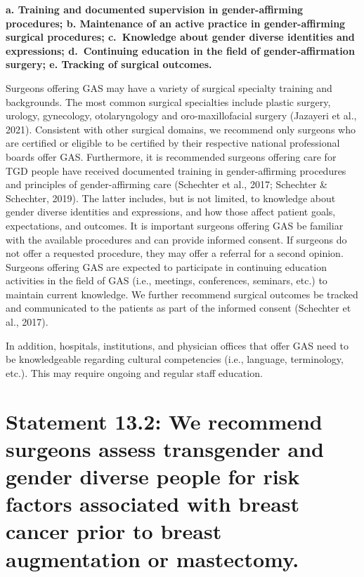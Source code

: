 \documentclass[
]{book}
\begin{document}
\textbf{a. Training and documented supervision in gender-affirming procedures;
b. Maintenance of an active practice in gender-affirming surgical procedures;
c.~Knowledge about gender diverse identities and expressions;
d.~Continuing education in the field of gender-affirmation surgery;
e. Tracking of surgical outcomes.}

Surgeons offering GAS may have a variety of
surgical specialty training and backgrounds. The
most common surgical specialties include plastic
surgery, urology, gynecology, otolaryngology and
oro-maxillofacial surgery (Jazayeri et al., 2021).
Consistent with other surgical domains, we recommend only surgeons who are certified or eligible
to be certified by their respective national professional boards offer GAS. Furthermore, it is recommended surgeons offering care for TGD people
have received documented training in
gender-affirming procedures and principles of
gender-affirming care (Schechter et al., 2017;
Schechter \& Schechter, 2019). The latter includes,
but is not limited, to knowledge about gender
diverse identities and expressions, and how those
affect patient goals, expectations, and outcomes. It
is important surgeons offering GAS be familiar with
the available procedures and can provide informed
consent. If surgeons do not offer a requested procedure, they may offer a referral for a second opinion. Surgeons offering GAS are expected to
participate in continuing education activities in the
field of GAS (i.e., meetings, conferences, seminars,
etc.) to maintain current knowledge. We further
recommend surgical outcomes be tracked and communicated to the patients as part of the informed
consent (Schechter et al., 2017).

In addition, hospitals, institutions, and physician offices that offer GAS need to be knowledgeable regarding cultural competencies (i.e.,
language, terminology, etc.). This may require
ongoing and regular staff education.

\hypertarget{statement-13.2-we-recommend-surgeons-assess-transgender-and-gender-diverse-people-for-risk-factors-associated-with-breast-cancer-prior-to-breast-augmentation-or-mastectomy.}{%
\section*{Statement 13.2: We recommend surgeons assess transgender and gender diverse people for risk factors associated with breast cancer prior to breast augmentation or mastectomy.}\label{statement-13.2-we-recommend-surgeons-assess-transgender-and-gender-diverse-people-for-risk-factors-associated-with-breast-cancer-prior-to-breast-augmentation-or-mastectomy.}}
\end{document}
